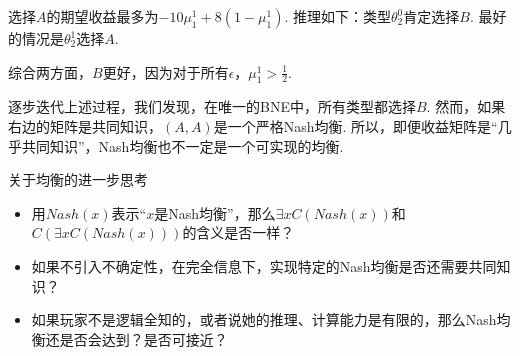 选择$A$的期望收益最多为$-10\mu_1^1 + 8(1 - \mu_1^1)$. 推理如下：类型$\theta_2^0$肯定选择$B$. 最好的情况是$\theta_2^1$选择$A$. 

综合两方面，$B$更好，因为对于所有$\epsilon$，$\mu_1^1 > \frac{1}{2}$. 

逐步迭代上述过程，我们发现，在唯一的BNE中，所有类型都选择$B$. 然而，如果右边的矩阵是共同知识，$(A,A)$是一个严格Nash均衡. 所以，即便收益矩阵是“几乎共同知识”，Nash均衡也不一定是一个可实现的均衡. 

\begin{remark}
    {关于均衡的进一步思考}
\begin{itemize}
    \item 用$Nash(x)$表示“$x$是Nash均衡”，那么$\exists x C(Nash(x))$和$C(\exists x C(Nash(x)))$的含义是否一样？
    \item 如果不引入不确定性，在完全信息下，实现特定的Nash均衡是否还需要共同知识？
    \item 如果玩家不是逻辑全知的，或者说她的推理、计算能力是有限的，那么Nash均衡还是否会达到？是否可接近？
\end{itemize}
\end{remark}
